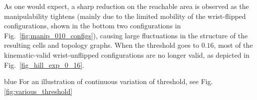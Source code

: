 \documentclass[Afour,sageh,times]{sagej}
\begin{document}
As one would expect, a sharp reduction on the reachable area is observed as the manipulability tightens 
(mainly due to the limited mobility of the wrist-flipped configurations, shown in the bottom two configurations 
in Fig.~\ref{fig:manip_010_configs}), causing large fluctuations in the structure of the resulting cells and topology graphs. When the threshold goes to $0.16$, most of the kinematic-valid wrist-unflipped configurations are no longer valid, as depicted in Fig.~\ref{fig_hill_exp_0_16}. 
\begin{color}{blue}
For an illustration of continuous variation of threshold, see Fig.\ref{fig:various_threshold}
\end{color}



\begin{figure}[t]
\centering
{}

\end{figure}
\end{document}
